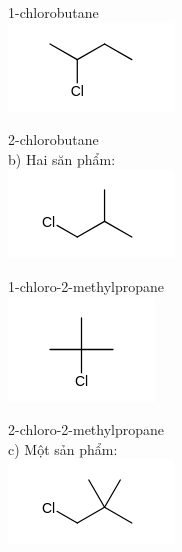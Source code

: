 \documentclass[10pt]{article}
\begin{document}
1-chlorobutane\\
\includegraphics{smile-762bef93410011c817917fee1eb90b9e01eb4de1}

2-chlorobutane\\
b) Hai săn phẩm:\\
\includegraphics{smile-7ea2cab81c1d2fa898c0047d47a0ee69e4ae639f}

1-chloro-2-methylpropane\\
\includegraphics{smile-1e00284413d7d159ebb51408273bf164216386bb}

2-chloro-2-methylpropane\\
c) Một sản phẩm:\\
\includegraphics{smile-9359858e24c4974c03e3b9544063860ed11b9388}
\end{document}
